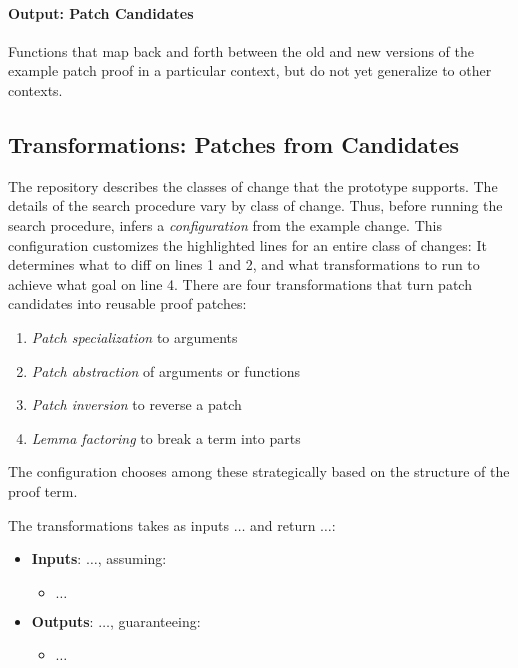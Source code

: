 \paragraph{Output: Patch Candidates}
Functions that map back and forth between the old and new versions
of the example patch proof in a particular context, but do not yet generalize to other contexts.
\fi

\subsection{Transformations: Patches from Candidates}
\label{sec:pumpkin-spec-trans}

The \sysname repository describes the classes of change that the
\sysname prototype supports.
The details of the \sysname search procedure vary by class of change.
Thus, before running the search procedure, \sysname infers a \textit{configuration} from the example change.
This configuration customizes the highlighted lines for an entire class of changes:
It determines what to diff on lines 1 and 2,
and what transformations to run to achieve what goal on line 4.
There are four transformations that turn patch candidates into reusable proof patches:

\begin{enumerate}
\item \textit{Patch specialization} to arguments
\item \textit{Patch abstraction} of arguments or functions
\item \textit{Patch inversion} to reverse a patch
\item \textit{Lemma factoring} to break a term into parts
\end{enumerate}
The configuration chooses among these strategically based on the structure of the proof term.

The transformations takes as inputs $\ldots$ and return $\ldots$:

\begin{itemize}
\item \textbf{Inputs}: $\ldots$, assuming:
\begin{itemize}
\item $\ldots$
\end{itemize}
\item \textbf{Outputs}: $\ldots$, guaranteeing:
\begin{itemize}
\item $\ldots$
\end{itemize}
\end{itemize}

